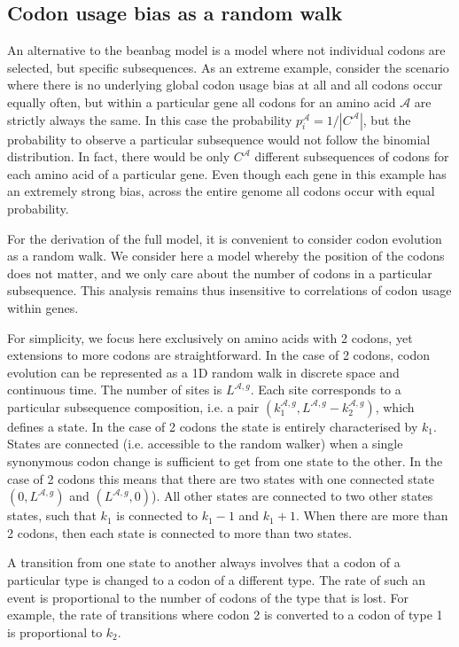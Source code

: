 \documentclass[a4paper,10pt]{paper}%
\begin{document}
\subsection{Codon usage bias as a random walk}

An alternative to the  beanbag model is a model where not individual codons are selected, but specific subsequences. As an extreme example, consider the  scenario where there is no underlying global codon usage bias at all and all codons occur equally often, but within a particular gene all codons  for an amino acid $\mathcal A$ are strictly always the same. In this case  the probability $p_i^{\mathcal A}= 1/|C^\mathcal A|$, but the probability to observe a particular subsequence would not follow the binomial distribution. In fact, there  would be only  $C^\mathcal A$ different subsequences of codons for  each  amino acid of a particular gene. Even though each gene in this example has an extremely strong bias, across the entire genome all codons occur with equal probability.  
 \par
For the derivation of the full model, it is convenient to consider codon evolution as a random walk. We consider here a model whereby the position of the codons does not matter, and we only care about the number of codons in a particular subsequence.  This analysis remains thus insensitive to correlations of codon usage within genes. 
\par
For simplicity, we focus here exclusively  on amino acids with 2 codons, yet extensions  to more codons are straightforward. In the case  of 2 codons,  codon evolution can be represented as a 1D random walk in discrete space and continuous time. The number of sites is $L^{\mathcal A,g}$.  Each site corresponds to a particular subsequence composition, i.e. a pair $(k_1^{\mathcal A,g},L^{\mathcal A,g}- k_2^{\mathcal A,g})$, which defines a state. In the case of 2 codons  the state is entirely characterised by $k_1$.  States are connected (i.e.  accessible to the random walker) when a single synonymous codon change is sufficient to get from one state to the other. In the case of 2 codons this means that  there are two states with one connected state $(0,L^{\mathcal A,g})$ and  $(L^{\mathcal A,g},0)$). All other states are connected to two other states states, such that $k_1$ is connected to $k_1-1$ and $k_1+1$. When there are more than 2 codons, then each state is connected to more than two states. 
\par
A transition from one state to another always involves that a codon of a particular type is changed to a codon of a different type. The rate of such an event is proportional to the number of codons of the type that is lost. For example, the rate of transitions where codon 2 is converted to a codon of type 1 is proportional to $k_2$.
\end{document}

